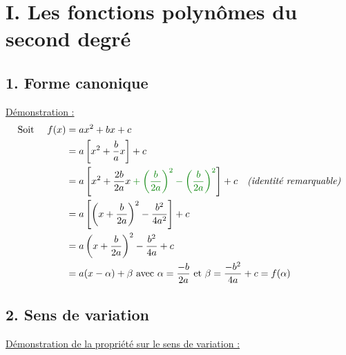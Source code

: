 \documentclass[11pt,a4paper]{article}
\title{\titre}
\author{\classe \\ \theme}
\date{}
\begin{document}
\maketitle
\pagestyle{custom}
\thispagestyle{custom}

\section*{I. Les fonctions polynômes du second degré}
\subsection*{1. Forme canonique}

\underline{Démonstration :}
\begin{alignat*}{2}
     & \text{Soit } & f(x) & = ax^2+bx+c                                                                                     \\
     &              &      & = a\left[x^2+\frac{b}{a}x\right]+c                                                              \\
     &              &      & = a\left[x^2+\frac{2b}{2a}x \color{dark_green}+ \left(\frac{b}{2a}\right)^2- \left(\frac{b}{2a}\right)^2\color{black}\right]+c \text{\quad\emph{(identité remarquable)}}\\
     &              &      & = a\left[\left(x+\frac{b}{2a}\right)^2-\frac{b^2}{4a^2}\right]+c                               \\
     &              &      & = a\left(x+\frac{b}{2a}\right)^2-\frac{b^2}{4a}+c                                               \\
     &              &      & = a(x-\alpha)+\beta \text{ avec $\alpha=\frac{-b}{2a}$ et $\beta=\frac{-b^2}{4a}+c=f(\alpha)$}
\end{alignat*}

\subsection*{2. Sens de variation}

\underline{Démonstration de la propriété sur le sens de variation :}
\end{document}
